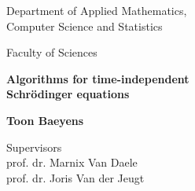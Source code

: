 \begin{titlepage}


    \begin{minipage}{6cm}
        \begin{flushleft}
            Department of Applied Mathematics, \\
            Computer Science and Statistics

            \vspace{3mm}

            {Faculty of Sciences}
        \end{flushleft}
    \end{minipage}

    \vspace{4cm}

    \begin{center}
        \textbf{ Algorithms for time-independent\\Schrödinger equations}


        \vspace{5mm}

        \textbf{ Toon Baeyens}

    \end{center}

    \vspace{1cm}

    \begin{flushleft}
        Supervisors \\
        prof. dr. Marnix Van Daele\\
        prof. dr. Joris Van der Jeugt
    \end{flushleft}


\end{titlepage}
